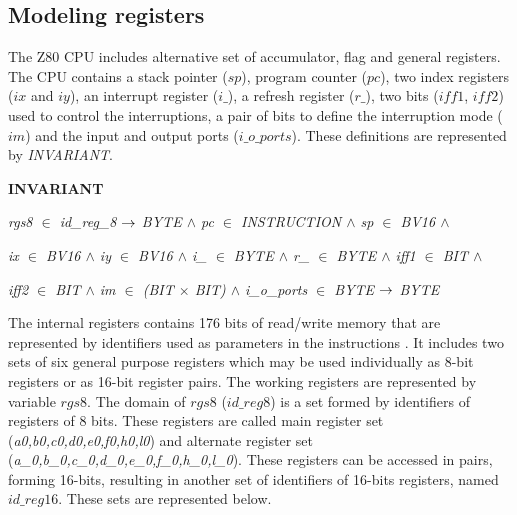 \documentclass[a4paper]{llncs}
\begin{document}
\subsection{Modeling registers}

The Z80 CPU includes alternative set of accumulator, flag and general registers.
The CPU contains a stack pointer ($\textit{sp}$), program counter
($\textit{pc}$), two index registers ($\textit{ix}$ and $\textit{iy}$), an
interrupt register ($\textit{i\_}$), a refresh register ($\textit{r\_}$), two
bits ($\textit{iff1}$, $\textit{iff2}$) used to control the interruptions, a
pair of bits to define the interruption mode ($\textit{im}$) and the input and
output ports ($\textit{i\_o\_ports}$). These definitions are represented by
\textit{INVARIANT}.
  

\begin{sloppypar}
\bf INVARIANT

\hspace*{0.10in}\it rgs8  $\in$  \it id\_reg\_8  $\rightarrow$  \it BYTE  $\land$ \it pc  $\in$  \it INSTRUCTION  $\land$  \it sp  $\in$  \it BV16 $\land$

\hspace*{0.10in}\it ix  $\in$  \it BV16  $\land$ \it iy  $\in$  \it BV16  $\land$ \it i\_  $\in$  \it BYTE  $\land$  \it r\_ $\in$  \it BYTE  $\land$ \it iff1  $\in$  \it BIT  $\land$ 

\hspace*{0.10in}\it iff2  $\in$  \it BIT  $\land$ \it im $\in$ (\it BIT $\times$ \it BIT\rm )  $\land$  \it i\_o\_ports  $\in$  \it BYTE  $\rightarrow$  \it BYTE
\end{sloppypar}


 

The internal registers contains 176 bits of read/write memory that are
represented by identifiers used as parameters in the instructions . It includes
two sets of six general purpose registers which may be used individually as
8-bit registers or as 16-bit register pairs.  The working registers are
represented by variable $\textit{rgs8}$. The domain of $\textit{rgs8}$
($\textit{id\_reg8}$) is a set formed by identifiers of registers of 8 bits.
These registers are called main register set (\textit{a0,b0,c0,d0,e0,f0,h0,l0})
and alternate register set (\textit{a\_0,b\_0,c\_0,d\_0,e\_0,f\_0,h\_0,l\_0}).
These registers can be accessed in pairs, forming 16-bits, resulting in another
set of identifiers of 16-bits registers, named $\textit{id\_reg16}$. These sets
are represented below.
\end{document}

